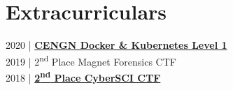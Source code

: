 \documentclass[letterpaper]{deedy-resume} %
\begin{document}
\begin{minipage}[t]{0.33\textwidth}
\section{Extracurriculars}
2020 | \href{https://www.credly.com/badges/7a6c2383-9563-4d67-9878-a40bee831e53?source=linked_in_profile}{\bf CENGN Docker \& Kubernetes Level 1}\\
2019 | 2\textsuperscript{nd} Place Magnet Forensics CTF\\
2018 | \href{https://newsroom.carleton.ca/2018/mayors-cyber-challenge-cup-announces-winning-teams/}{\bf 2\textsuperscript{nd} Place CyberSCI CTF}\\


\end{minipage} %
\hfill
%
%
\end{document}
